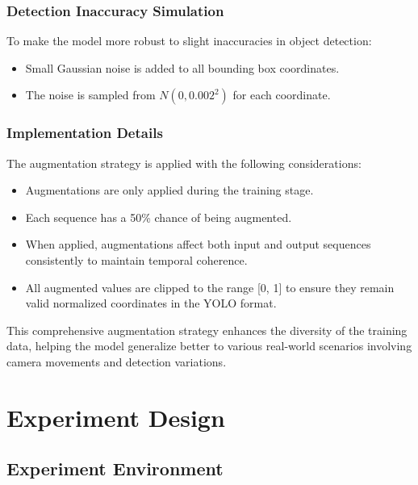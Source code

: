 \documentclass[12pt,oneside]{book} %
\begin{document}
\subsection{Detection Inaccuracy Simulation}

To make the model more robust to slight inaccuracies in object detection:

\begin{itemize}
    \item Small Gaussian noise is added to all bounding box coordinates.
    \item The noise is sampled from $N(0, 0.002^2)$ for each coordinate.
\end{itemize}

\subsection{Implementation Details}

The augmentation strategy is applied with the following considerations:

\begin{itemize}
    \item Augmentations are only applied during the training stage.
    \item Each sequence has a 50\% chance of being augmented.
    \item When applied, augmentations affect both input and output sequences consistently
          to maintain temporal coherence.
    \item All augmented values are clipped to the range [0, 1] to ensure they remain
          valid normalized coordinates in the YOLO format.
\end{itemize}

This comprehensive augmentation strategy enhances the diversity of the training
data, helping the model generalize better to various real-world scenarios
involving camera movements and detection variations.

\chapter{Experiment Design}\label{chap:experiment_design}
\section{Experiment Environment}
\end{document}
